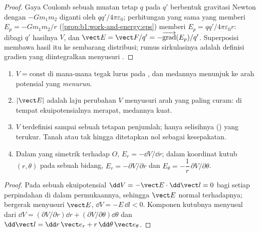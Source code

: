 \begin{proof}
Gaya Coulomb sebuah muatan tetap $q$ pada $q'$ berbentuk gravitasi Newton
dengan $-Gm_1m_2$ diganti oleh $qq'/4\pi\varepsilon_0$; perhitungan yang sama
yang memberi $E_p = -Gm_1m_2/r$
(\cref{prop:b1:work-and-energy:eps}) memberi $E_p = qq'/4\pi\varepsilon_0r$:
dibagi $q'$ hasilnya $V$, dan $\vect E = \vect F/q' =
-\overrightarrow{\operatorname{grad}}(E_p)/q'$. Superposisi membawa hasil itu
ke sembarang distribusi; rumus sirkulasinya adalah definisi gradien yang
diintegralkan menyusuri .
\end{proof}

\begin{proposition}\label{prop:b1:potential-capacitors:reading}
\begin{enumerate}
  \item \emph{} $V = \text{const}$ di mana-mana
        tegak lurus pada , dan medannya menunjuk ke arah
        potensial yang \emph{menurun}.
  \item $|\vect E|$ adalah laju perubahan $V$ menyusuri arah yang paling
        curam: di tempat ekuipotensialnya merapat, medannya kuat.
  \item $V$ terdefinisi sampai sebuah tetapan penjumlah; hanya selisihnya
        () yang terukur. Tanah atau tak hingga ditetapkan nol
        sebagai kesepakatan.
  \item Dalam  yang simetrik terhadap $O$, $E_r = -\dd V/
        \dd r$; dalam koordinat kutub $(r, \theta)$ pada sebuah bidang,
        $E_r = -\partial V/\partial r$ dan $E_\theta = -\dfrac1r\,\partial V/\partial\theta$.
\end{enumerate}
\end{proposition}

\begin{proof}
Pada sebuah ekuipotensial $\dd V = -\vect E\cdot\dd\vect l = 0$ bagi setiap
perpindahan di dalam permukaannya, sehingga $\vect E$ normal terhadapnya;
bergerak menyusuri $\vect E$, $\dd V = -E\,\dd l < 0$. Komponen kutubnya menyusul dari
$\dd V = (\partial V/\partial r)\dd r + (\partial V/\partial\theta)\dd\theta$ dan
$\dd\vect l = \dd r\,\vect e_r + r\,\dd\theta\,\vect e_\theta$.
\end{proof}

